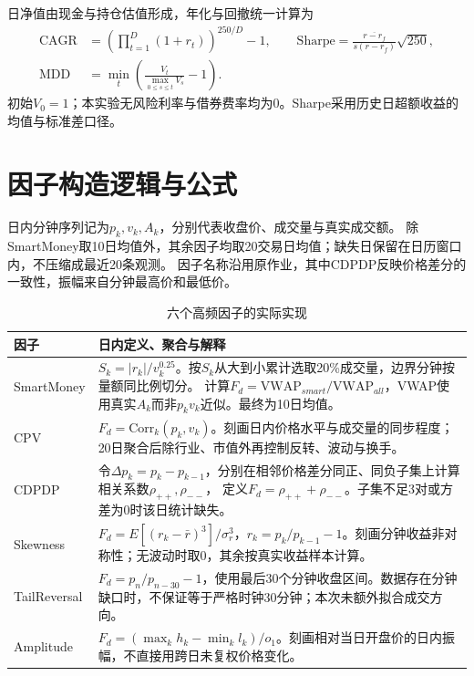 \documentclass[UTF8,zihao=-4,fontset=fandol]{ctexart}
\begin{document}
日净值由现金与持仓估值形成，年化与回撤统一计算为
\begin{equation}
\begin{aligned}
\mathrm{CAGR}&=\left(\prod_{t=1}^D(1+r_t)\right)^{250/D}-1,\qquad
\mathrm{Sharpe}=\frac{\overline{r-r_f}}{s(r-r_f)}\sqrt{250},\\
\mathrm{MDD}&=\min_t\left(\frac{V_t}{\max_{0\le s\le t}V_s}-1\right).
\end{aligned}
\end{equation}
初始$V_0=1$；本实验无风险利率与借券费率均为0。Sharpe采用历史日超额收益的均值与标准差口径\cite{sharpe}。

\clearpage
\section{因子构造逻辑与公式}
日内分钟序列记为$p_k,v_k,A_k$，分别代表收盘价、成交量与真实成交额。
除SmartMoney取10日均值外，其余因子均取20交易日均值；缺失日保留在日历窗口内，不压缩成最近20条观测。
因子名称沿用原作业，其中CDPDP反映价格差分的一致性，振幅来自分钟最高价和最低价。

\begin{table}[H]\centering\small
\caption{六个高频因子的实际实现}
\begin{tabularx}{\linewidth}{p{27mm}X}
\toprule 因子 & 日内定义、聚合与解释\\\midrule
SmartMoney & $S_k=|r_k|/v_k^{0.25}$。按$S_k$从大到小累计选取20\%成交量，边界分钟按量额同比例切分。
计算$F_d=\mathrm{VWAP}_{smart}/\mathrm{VWAP}_{all}$，VWAP使用真实$A_k$而非$p_kv_k$近似。最终为10日均值。\\[3pt]
CPV & $F_d=\mathrm{Corr}_k(p_k,v_k)$。刻画日内价格水平与成交量的同步程度；20日聚合后除行业、市值外再控制反转、波动与换手。\\[3pt]
CDPDP & 令$\Delta p_k=p_k-p_{k-1}$，分别在相邻价格差分同正、同负子集上计算相关系数$\rho_{++},\rho_{--}$，
定义$F_d=\rho_{++}+\rho_{--}$。子集不足3对或方差为0时该日统计缺失。\\[3pt]
Skewness & $F_d=E[(r_k-\bar r)^3]/\sigma_r^3$，$r_k=p_k/p_{k-1}-1$。刻画分钟收益非对称性；无波动时取0，其余按真实收益样本计算。\\[3pt]
TailReversal & $F_d=p_n/p_{n-30}-1$，使用最后30个分钟收盘区间。数据存在分钟缺口时，不保证等于严格时钟30分钟；本次未额外拟合成交方向。\\[3pt]
Amplitude & $F_d=(\max_k h_k-\min_k l_k)/o_1$。刻画相对当日开盘价的日内振幅，不直接用跨日未复权价格变化。\\\bottomrule
\end{tabularx}\end{table}
\end{document}
